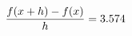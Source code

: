 \documentclass[preview]{standalone}
\begin{document}
\begin{align*}
\special{dvisvgm:raw <g id='unique000'>}\frac{f(x+h)-f(x)}{h} = 3.574\special{dvisvgm:raw </g>}
\end{align*}
\end{document}
